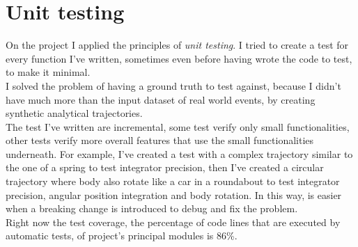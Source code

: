 \section{Unit testing}
On the project I applied the principles of \textit{unit testing}. I tried to create a test for every function I've written, sometimes even before having wrote the code to test, to make it minimal. \\
I solved the problem of having a ground truth to test against, because I didn't have much more than the input dataset of real world events, by creating synthetic analytical trajectories. \\
The test I've written are incremental, some test verify only small functionalities, other tests verify more overall features that use the small functionalities underneath. For example, I've created a test with a complex trajectory similar to the one of a spring to test integrator precision, then I've created a circular trajectory where body also rotate like a car in a roundabout to test integrator precision, angular position integration and body rotation.
In this way, is easier when a breaking change is introduced to debug and fix the problem.\\
Right now the test coverage, the percentage of code lines that are executed by automatic tests, of project's principal modules is 86\%. \\ 